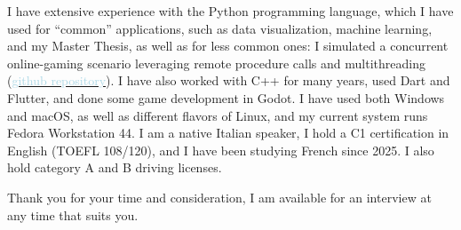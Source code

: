 \documentclass[12pt,a4paper,sans]{moderncv} %
\newcommand{\bluelink}[2]{\href{#1}{\textcolor{lightblue}{#2}}}
\begin{document}
\vspace{2mm}

I have extensive experience with the Python programming language, which I have used for ``common'' applications, such as data visualization, machine learning, and my Master Thesis, as well as for less common ones: I simulated a concurrent online-gaming scenario leveraging remote procedure calls and multithreading (\bluelink{https://github.com/mhetacc/Raftian}{github repository}). I have also worked with C++ for many years, used Dart and Flutter, and done some game development in Godot. I have used both Windows and macOS, as well as different flavors of Linux, and my current system runs Fedora Workstation 44. I am a native Italian speaker, I hold a C1 certification in English (TOEFL 108/120), and I have been studying French since 2025. I also hold category A and B driving licenses.


\vspace{2mm}



Thank you for your time and consideration, I am available for an interview at any time that suits you.





\end{document}
